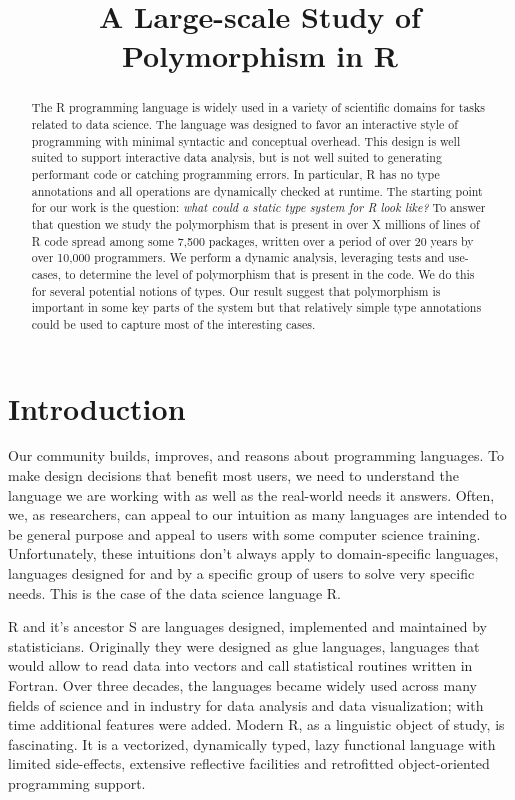 \documentclass[acmsmall,10pt,review,anonymous]{acmart}\settopmatter{printfolios=true,printccs=false,printacmref=false}
\begin{document}
\title{A Large-scale Study of Polymorphism in R}

\begin{abstract}
The R programming language is widely used in a variety of scientific domains
for tasks related to data science. The language was designed to favor an
interactive style of programming with minimal syntactic and conceptual
overhead. This design is well suited to support interactive data analysis,
but is not well suited to generating performant code or catching programming
errors.  In particular, R has no type annotations and all operations are
dynamically checked at runtime. The starting point for our work is the
question: \emph{what could a static type system for R look like?}  To answer
that question we study the polymorphism that is present in over X millions
of lines of R code spread among some 7,500 packages, written over a period of
over 20 years by over 10,000 programmers.  We perform a dynamic analysis,
leveraging tests and use-cases, to determine the level of polymorphism that
is present in the code. We do this for several potential notions of
types. Our result suggest that polymorphism is important in some key parts
of the system but that relatively simple type annotations could be used to
capture most of the interesting cases.
\end{abstract}

\maketitle

\section{Introduction}

Our community builds, improves, and reasons about programming languages.  To
make design decisions that benefit most users, we need to understand the
language we are working with as well as the real-world needs it
answers. Often, we, as researchers, can appeal to our intuition as many
languages are intended to be general purpose and appeal to users with some
computer science training. Unfortunately, these intuitions don't always
apply to domain-specific languages, languages designed for and by a specific
group of users to solve very specific needs. This is the case of the data
science language R.

R and it's ancestor S are languages designed, implemented and maintained by
statisticians. Originally they were designed as glue languages, languages
that would allow to read data into vectors and call statistical routines
written in Fortran. Over three decades, the languages became widely used
across many fields of science and in industry for data analysis and data
visualization; with time additional features were added.  Modern R, as a
linguistic object of study, is fascinating. It is a vectorized, dynamically
typed, lazy functional language with limited side-effects, extensive
reflective facilities and retrofitted object-oriented programming support.
\end{document}
